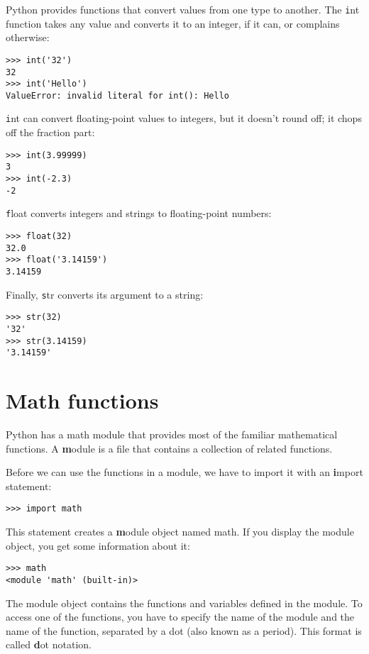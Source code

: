 \documentclass[
DIV=11,
fontsize=12,
twoside,
headinclude=false,
titlepage=firstiscover,
abstract=true,
headsepline=true,
footsepline=true,
chapterprefix=true, %
headings=big,
bibliography=totoc,%
captions=tableheading
]{scrbook}
\theoremstyle{definition}
\begin{document}
Python provides functions that convert values
from one type to another.  The {\texttt int} function takes any value and
converts it to an integer, if it can, or complains otherwise:

\begin{lstlisting}
>>> int('32')
32
>>> int('Hello')
ValueError: invalid literal for int(): Hello
\end{lstlisting}
%
{\texttt int} can convert floating-point values to integers, but it
doesn't round off; it chops off the fraction part:

\begin{lstlisting}
>>> int(3.99999)
3
>>> int(-2.3)
-2
\end{lstlisting}
%
{\texttt float} converts integers and strings to floating-point
numbers:

\begin{lstlisting}
>>> float(32)
32.0
>>> float('3.14159')
3.14159
\end{lstlisting}
%
Finally, {\texttt str} converts its argument to a string:

\begin{lstlisting}
>>> str(32)
'32'
>>> str(3.14159)
'3.14159'
\end{lstlisting}
%

\section{Math functions}

Python has a math module that provides most of the familiar
mathematical functions.  A {\textbf module} is a file that contains a
collection of related functions.

Before we can use the functions in a module, we have to import it with
an {\textbf import statement}:

\begin{lstlisting}
>>> import math
\end{lstlisting}
%
This statement creates a {\textbf module object} named math.  If
you display the module object, you get some information about it:

\begin{lstlisting}
>>> math
<module 'math' (built-in)>
\end{lstlisting}
%
The module object contains the functions and variables defined in the
module.  To access one of the functions, you have to specify the name
of the module and the name of the function, separated by a dot (also
known as a period).  This format is called {\textbf dot notation}.
\end{document}
